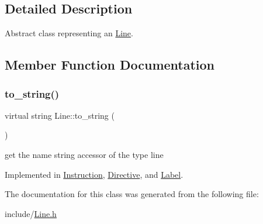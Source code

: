 \subsection{Detailed Description}
Abstract class representing an \mbox{\hyperlink{class_line}{Line}}. 

\subsection{Member Function Documentation}
\mbox{\label{class_line_a477523118f17d72f58f2912b391afc73}} 
\subsubsection{\texorpdfstring{to\+\_\+string()}{to\_string()}}
{\footnotesize\ttfamily virtual string Line\+::to\+\_\+string (\begin{DoxyParamCaption}{ }\end{DoxyParamCaption})\hspace{0.3cm}{\ttfamily [pure virtual]}}



get the name string accessor of the type line 



Implemented in \mbox{\hyperlink{class_instruction_aed87de5e9259f4f15dc885425528f1fe}{Instruction}}, \mbox{\hyperlink{class_directive_a2fd56d5580ad7a993782649d7867732f}{Directive}}, and \mbox{\hyperlink{class_label_a6df2e96366cc459a6a8fa9642a6e69b6}{Label}}.



The documentation for this class was generated from the following file\+:\begin{DoxyCompactItemize}
\item 
include/\mbox{\hyperlink{_line_8h}{Line.\+h}}\end{DoxyCompactItemize}
